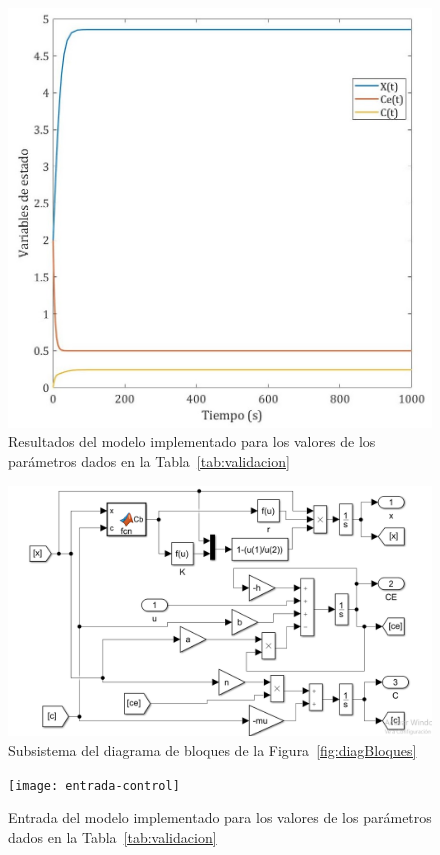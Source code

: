 \begin{figure}[ht!]
\centering
\includegraphics[scale = 0.36]{validacion}
\caption{Resultados del modelo implementado para los valores de los parámetros dados en la Tabla~\ref{tab:validacion}}
\label{fig:validacion2}
\end{figure}
\begin{figure}[th!]
\centering
\includegraphics[scale = 0.5]{diagrama-de-bloques}
\caption{Subsistema del diagrama de bloques de la Figura~\ref{fig:diagBloques}}
\label{fig:diagBloques1}
\end{figure}


\begin{figure}[ht!]
\centering
\texttt{[image: entrada-control]}
\caption{Entrada del modelo implementado para los valores de los parámetros dados en la Tabla~\ref{tab:validacion}}
\label{fig:entrada-validacion}
\end{figure}

